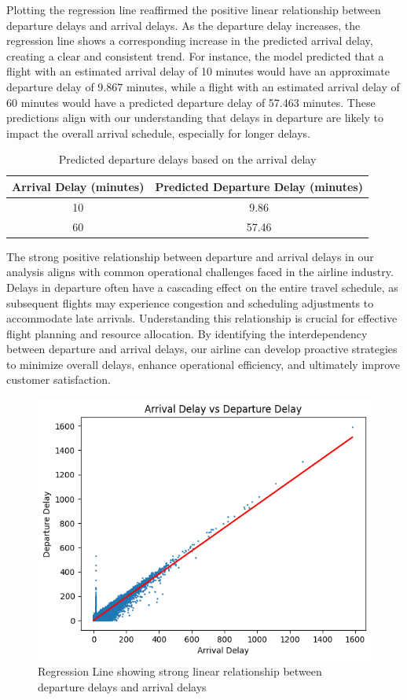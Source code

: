 \documentclass[11pt]{article}
\begin{document}
Plotting the regression line reaffirmed the positive linear relationship between departure delays and arrival delays. As the departure delay increases, the regression line shows a corresponding increase in the predicted arrival delay, creating a clear and consistent trend. For instance, the model predicted that a flight with an estimated arrival delay of 10 minutes would have an approximate departure delay of 9.867 minutes, while a flight with an estimated arrival delay of 60 minutes would have a predicted departure delay of 57.463 minutes. These predictions align with our understanding that delays in departure are likely to impact the overall arrival schedule, especially for longer delays.

\begin{table}[!h]
    \centering
    \begin{tabular}{|c|c|}
            \hline
            Arrival Delay (minutes) &  Predicted Departure Delay (minutes) \\
            \hline
            10   &   9.86 \\
            \hline
            60     &   57.46  \\
            \hline
    \end{tabular}
    \caption{\centering Predicted departure delays based on the arrival delay}
    \label{tab:lr-3-eval}
\end{table}

The strong positive relationship between departure and arrival delays in our analysis aligns with common operational challenges faced in the airline industry. Delays in departure often have a cascading effect on the entire travel schedule, as subsequent flights may experience congestion and scheduling adjustments to accommodate late arrivals. Understanding this relationship is crucial for effective flight planning and resource allocation. By identifying the interdependency between departure and arrival delays, our airline can develop proactive strategies to minimize overall delays, enhance operational efficiency, and ultimately improve customer satisfaction.

\begin{figure}[h]
\centering
\includegraphics[width=0.5\linewidth]{project_files/project_42_1.png}
\caption{\centering Regression Line showing strong linear relationship between departure delays and arrival delays}
\end{figure}
\end{document}
